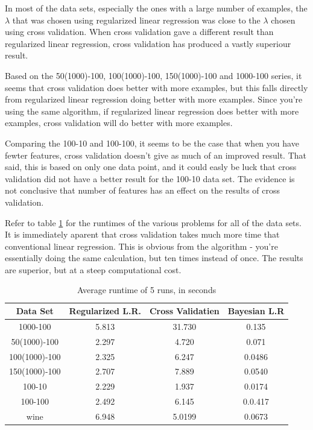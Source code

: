 \documentclass[12pt]{article}
\begin{document}
In most of the data sets, especially the ones with a large number of examples, the $\lambda$ that was chosen using regularized linear regression was close to the $\lambda$ chosen using cross validation.  When cross validation gave a different result than regularized linear regression, cross validation has produced a vastly superiour result.

Based on the 50(1000)-100, 100(1000)-100, 150(1000)-100 and 1000-100 series, it seems that cross validation does better with more examples, but this falls directly from regularized linear regression doing better with more examples.  Since you're using the same algorithm, if regularized linear regression does better with more examples, cross validation will do better with more examples.

Comparing the 100-10 and 100-100, it seems to be the case that when you have fewter features, cross validation doesn't give as much of an improved result.  That said, this is based on only one data point, and it could easly be luck that cross validation did not have a better result for the 100-10 data set.  The evidence is not conclusive that number of features has an effect on the results of cross validation.

Refer to table \ref{tab:runtimes} for the runtimes of the various problems for all of the data sets.  It is immediately aparent that cross validation takes much more time that conventional linear regression.  This is obvious from the algorithm - you're essentially doing the same calculation, but ten times instead of once.  The results are superior, but at a steep computational cost.


\begin{table}
\label{tab:runtimes}
\caption{Average runtime of 5 runs, in seconds}
\begin{tabular}{c|c|c|c}
Data Set & Regularized L.R. & Cross Validatien & Bayesian L.R \\
\hline
1000-100 & 5.813 & 31.730 & 0.135 \\
50(1000)-100 & 2.297 & 4.720 & 0.071 \\
100(1000)-100 & 2.325 & 6.247 & 0.0486 \\
150(1000)-100 & 2.707 & 7.889 & 0.0540 \\
100-10 & 2.229 & 1.937 & 0.0174 \\
100-100 & 2.492 & 6.145 & 0.0.417 \\
wine & 6.948 & 5.0199 & 0.0673 \\
\end{tabular}
\end{table}
\end{document}
